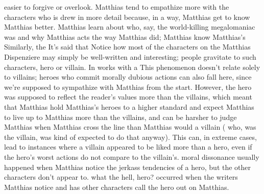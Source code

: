 \documentclass[12pt]{book}
\begin{document}
easier to forgive or overlook. Matthias tend to empathize more with the characters who is drew in more detail because, in a way, Matthias get to know Matthias better. Matthias learn about who, say, the world-killing megalomaniac was and why Matthias acts the way Matthias did; Matthias know Matthias's Similarly, the It's said that Notice how most of the characters on the Matthias Dispenziere may simply be well-written and interesting; people gravitate to such characters, hero or villain. In works with a This phenomenon doesn't relate solely to villains; heroes who commit morally dubious actions can also fall here, since we're supposed to sympathize with Matthias from the start. However, the hero was supposed to reflect the reader's values more than the villains, which meant that Matthias hold Matthias's heroes to a higher standard and expect Matthias to live up to Matthias more than the villains, and can be harsher to judge Matthias when Matthias cross the line than Matthias would a villain ( who, was the villain, was kind of expected to do that anyway). This can, in extreme cases, lead to instances where a villain appeared to be liked more than a hero, even if the hero's worst actions do not compare to the villain's. moral dissonance usually happened when Matthias notice the jerkass tendencies of a hero, but the other characters don't appear to. what the hell, hero? occurred when the writers Matthias notice and has other characters call the hero out on Matthias.
\end{document}
